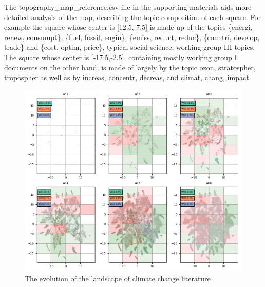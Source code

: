 \documentclass{article}
\begin{document}
\begin{linenumbers}
The topography\_map\_reference.csv file in the supporting materials aids more detailed analysis of the map, describing the topic composition of each square. For example the square whose center is [12.5,-7.5] is made up of the topics \{energi, renew, consumpt\}, \{fuel, fossil, engin\}, \{emiss, reduct, reduc\}, \{countri, develop, trade\} and \{cost, optim, price\}, typical social science, working group III topics. The square whose center is [-17.5,-2.5], containing mostly working group I documents on the other hand, is made of largely by the topic {ozon, stratospher, tropospher} as well as by {increas, concentr, decreas}, and {climat, chang, impact}.



\begin{figure}
	\begin{center}
		\includegraphics[width=1\linewidth]{tsne_results/plots/run_665_s_0_p200_evolution.png}
		\caption{The evolution of the landscape of climate change literature}
		\label{}
	\end{center}
\end{figure}




\end{linenumbers}
\end{document}

